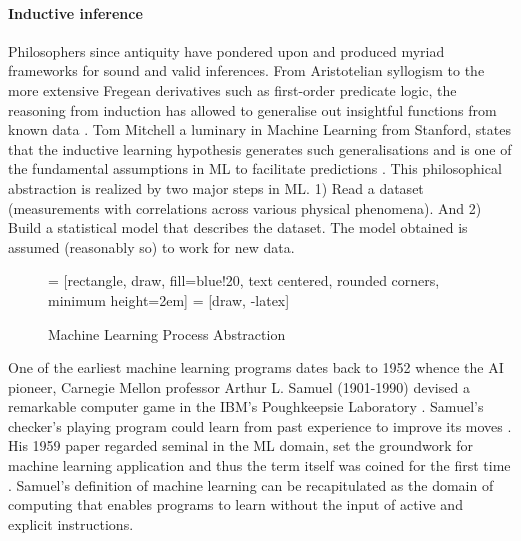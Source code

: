 \paragraph{Inductive inference}
Philosophers since antiquity have pondered upon and produced myriad frameworks for sound and valid inferences. From Aristotelian syllogism to the more extensive Fregean derivatives such as first-order predicate logic, the reasoning from induction has allowed to generalise out insightful functions from known data \parencite{thagard_philosophy_1990}. Tom Mitchell a luminary in Machine Learning from Stanford, states that the inductive learning hypothesis generates such generalisations and is one of the fundamental assumptions in ML to facilitate predictions \parencite*[23]{mitchell_machine_1997}. This philosophical abstraction is realized by two major steps in ML. 1) Read a dataset (measurements with correlations across various physical phenomena). And 2) Build a statistical model that describes the dataset. The model obtained is assumed (reasonably so) to work for new data.
\begin{figure}[H]
	\usetikzlibrary{positioning}
	\centering
	 = [rectangle, draw, fill=blue!20, text centered, rounded corners, minimum height=2em]
	 = [draw, -latex]
	\caption{Machine Learning Process Abstraction}
	\label{fig:mlp}
\end{figure}
One of the earliest machine learning programs dates back to 1952 whence the AI pioneer, Carnegie Mellon professor Arthur L. Samuel (1901-1990) devised a remarkable computer game  in the IBM's Poughkeepsie Laboratory \parencite{stanford_university_professor_2019}. Samuel's checker's playing program could learn from past experience to improve its moves \parencite{mccarthy_memoriam:_1990}. His 1959 paper regarded seminal in the ML domain, set the groundwork for machine learning application and thus the term itself was coined for the first time \parencite{samuel_studies_1959}. Samuel's definition of machine learning can be recapitulated as the domain of computing that enables programs to learn without the input of active and explicit instructions. 

